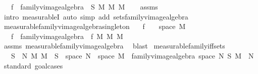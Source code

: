 \begin{isabellebody}
\ \ \ {\isachardoublequoteopen}f\ {\isasymin}\ family{\isacharunderscore}{\kern0pt}vimage{\isacharunderscore}{\kern0pt}algebra\ {\isasymOmega}\ S\ M\ {\isasymrightarrow}\isactrlsub M\ M{\isachardoublequoteclose}\isanewline
%
\isadelimproof
\ \ %
\endisadelimproof
%
\isatagproof
{}\isamarkupfalse%
\ assms\ \isamarkupfalse%
\ {\isacharparenleft}{\kern0pt}intro\ measurableI{\isacharcomma}{\kern0pt}\ auto\ simp\ add{\isacharcolon}{\kern0pt}\ sets{\isacharunderscore}{\kern0pt}family{\isacharunderscore}{\kern0pt}vimage{\isacharunderscore}{\kern0pt}algebra{\isacharparenright}{\kern0pt}%
\endisatagproof
{\isafoldproof}%
%
\isadelimproof
\isanewline
%
\endisadelimproof
\isanewline
{}\isamarkupfalse%
\ measurable{\isacharunderscore}{\kern0pt}family{\isacharunderscore}{\kern0pt}vimage{\isacharunderscore}{\kern0pt}algebra{\isacharunderscore}{\kern0pt}singleton{\isacharcolon}{\kern0pt}\isanewline
\ \ \ {\isachardoublequoteopen}f\ {\isasymin}\ {\isasymOmega}\ {\isasymrightarrow}\ space\ M{\isachardoublequoteclose}\isanewline
\ \ \ {\isachardoublequoteopen}f\ {\isasymin}\ family{\isacharunderscore}{\kern0pt}vimage{\isacharunderscore}{\kern0pt}algebra\ {\isasymOmega}\ {\isacharbraceleft}{\kern0pt}f{\isacharbraceright}{\kern0pt}\ M\ {\isasymrightarrow}\isactrlsub M\ M{\isachardoublequoteclose}\isanewline
%
\isadelimproof
\ \ %
\endisadelimproof
%
\isatagproof
{}\isamarkupfalse%
\ assms\ measurable{\isacharunderscore}{\kern0pt}family{\isacharunderscore}{\kern0pt}vimage{\isacharunderscore}{\kern0pt}algebra\ \isamarkupfalse%
\ blast%
\endisatagproof
{\isafoldproof}%
%
\isadelimproof
\isanewline
%
\endisadelimproof
\isanewline
{}\isamarkupfalse%
\ measurable{\isacharunderscore}{\kern0pt}family{\isacharunderscore}{\kern0pt}iff{\isacharunderscore}{\kern0pt}sets{\isacharcolon}{\kern0pt}\isanewline
\ \ \ {\isachardoublequoteopen}{\isacharparenleft}{\kern0pt}S\ {\isasymsubseteq}\ N\ {\isasymrightarrow}\isactrlsub M\ M{\isacharparenright}{\kern0pt}\ {\isasymlongleftrightarrow}\ S\ {\isasymsubseteq}\ space\ N\ {\isasymrightarrow}\ space\ M\ {\isasymand}\ family{\isacharunderscore}{\kern0pt}vimage{\isacharunderscore}{\kern0pt}algebra\ {\isacharparenleft}{\kern0pt}space\ N{\isacharparenright}{\kern0pt}\ S\ M\ {\isasymsubseteq}\ N{\isachardoublequoteclose}\isanewline
%
\isadelimproof
%
\endisadelimproof
%
\isatagproof
{}\isamarkupfalse%
\ {\isacharparenleft}{\kern0pt}standard{\isacharcomma}{\kern0pt}\ goal{\isacharunderscore}{\kern0pt}cases{\isacharparenright}{\kern0pt}\isanewline

\end{isabellebody}
